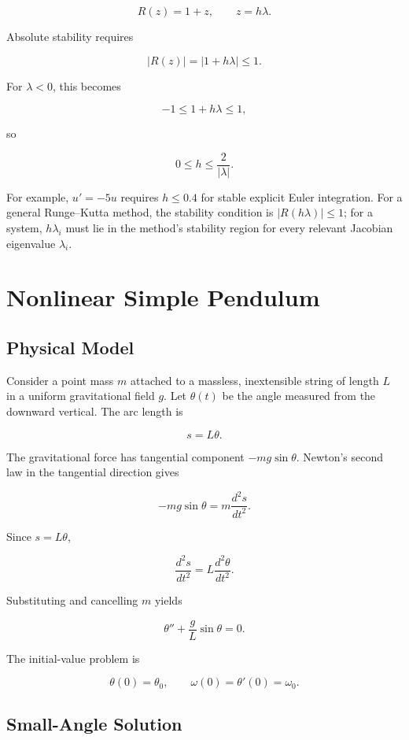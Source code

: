 \documentclass[12pt, a4paper]{article}
\theoremstyle{break}
\begin{document}
\[
R(z)=1+z,\qquad z=h\lambda.
\]

Absolute stability requires

\[
|R(z)|=|1+h\lambda|\le1.
\]

For \(\lambda<0\), this becomes

\[
-1\le1+h\lambda\le1,
\]

so

\[
0\le h\le\frac{2}{|\lambda|}.
\]

For example, \(u'=-5u\) requires \(h\le0.4\) for stable explicit Euler integration. For a general Runge--Kutta method, the stability condition is \(|R(h\lambda)|\le1\); for a system, \(h\lambda_i\) must lie in the method's stability region for every relevant Jacobian eigenvalue \(\lambda_i\).

\section{Nonlinear Simple Pendulum}\label{nonlinear-simple-pendulum}

\subsection{Physical Model}\label{physical-model}

Consider a point mass \(m\) attached to a massless, inextensible string of length \(L\) in a uniform gravitational field \(g\). Let \(\theta(t)\) be the angle measured from the downward vertical. The arc length is

\[
s=L\theta.
\]

The gravitational force has tangential component \(-mg\sin\theta\). Newton's second law in the tangential direction gives

\[
-mg\sin\theta=m\frac{d^2s}{dt^2}.
\]

Since \(s=L\theta\),

\[
\frac{d^2s}{dt^2}=L\frac{d^2\theta}{dt^2}.
\]

Substituting and cancelling \(m\) yields

\[
\boxed{\theta''+\frac gL\sin\theta=0}.
\]

The initial-value problem is

\[
\theta(0)=\theta_0,\qquad \omega(0)=\theta'(0)=\omega_0.
\]

\subsection{Small-Angle Solution}\label{small-angle-solution}
\end{document}
